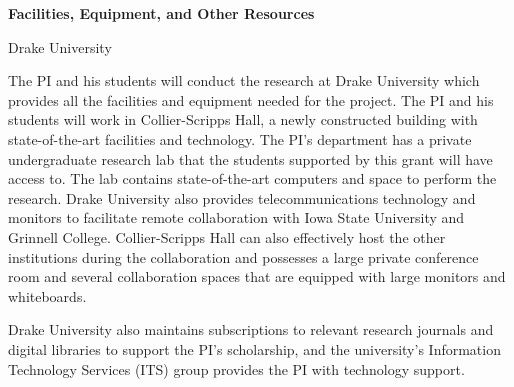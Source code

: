 \documentclass[11pt]{article}
\begin{document}
    \setcounter{page}{1}
    \begin{center}
        {\Large {\bf Facilities, Equipment, and Other Resources}}
    \end{center}

    \begin{center}
        {\Large Drake University}
    \end{center}

    The PI and his students will conduct the research at Drake University which provides all the facilities and equipment needed for the project.
    The PI and his students will work in Collier-Scripps Hall, a newly constructed building with state-of-the-art facilities and technology.
    The PI's department has a private undergraduate research lab that the students supported by this grant will have access to.
    The lab contains state-of-the-art computers and space to perform the research.
    Drake University also provides telecommunications technology and monitors to facilitate remote collaboration with Iowa State University and Grinnell College.
    Collier-Scripps Hall can also effectively host the other institutions during the collaboration and possesses a large private conference room and several collaboration spaces that are equipped with large monitors and whiteboards.

    Drake University also maintains subscriptions to relevant research journals and digital libraries to support the PI's scholarship, and the university's Information Technology Services (ITS) group provides the PI with technology support.
\end{document}
